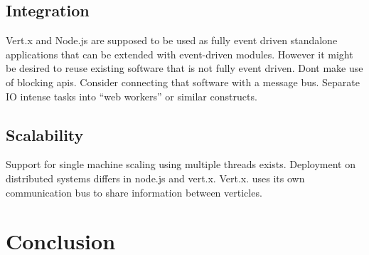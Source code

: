 \subsection{Integration}
\label{integration}
Vert.x and Node.js are supposed to be used as fully event driven standalone
applications that can be extended with event-driven modules.
However it might be desired to reuse existing software that is not fully event
driven.
Dont make use of blocking apis.
Consider connecting that software with a message bus.
Separate IO intense tasks into ``web workers'' or similar constructs.

\subsection{Scalability}
\label{scalability}
Support for single machine scaling using multiple threads exists.
Deployment on distributed systems differs in node.js and vert.x.
Vert.x. uses its own communication bus to share information between verticles.


\section{Conclusion}
\label{conclusion}
